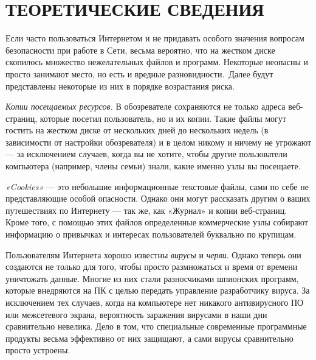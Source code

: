\section{ТЕОРЕТИЧЕСКИЕ СВЕДЕНИЯ}

Если часто пользоваться Интернетом и не придавать особого значения вопросам
безопасности при работе в Сети, весьма вероятно, что на жестком диске скопилось
множество нежелательных файлов и программ. Некоторые неопасны и просто занимают место,
но есть и вредные разновидности. Далее будут представлены некоторые из
них в порядке возрастания риска.

\textit{Копии посещаемых ресурсов.} В обозревателе сохраняются не только
адреса веб-страниц, которые посетил пользователь, но и их копии.
Такие файлы могут гостить на жестком диске от нескольких дней до нескольких недель
(в зависимости от настройки обозревателя) и в целом никому и ничему
не угрожают --- за исключением случаев, когда вы не хотите, чтобы другие
пользователи компьютера (например, члены семьи) знали, какие именно узлы вы посещаете.

\textit{«Cookies»} --- это небольшие информационные текстовые файлы,
сами по себе не представляющие особой опасности. Однако они могут
рассказать другим о ваших путешествиях по Интернету --- так же,
как «Журнал» и копии веб-страниц. Кроме того, с помощью этих файлов
определенные коммерческие узлы собирают информацию о привычках
и интересах пользователей буквально по крупицам.

Пользователям Интернета хорошо известны \textit{вирусы} и \textit{черви}.
Однако теперь они создаются не только для того, чтобы просто размножаться
и время от времени уничтожать данные. Многие из них стали разносчиками
шпионских программ, которые внедряются на ПК с целью передать управление
разработчику вируса. За исключением тех случаев, когда на компьютере
нет никакого антивирусного ПО или межсетевого экрана, вероятность заражения
вирусами в наши дни сравнительно невелика. Дело в том,
что специальные современные программные продукты весьма эффективно
от них защищают, а сами вирусы сравнительно просто устроены.

